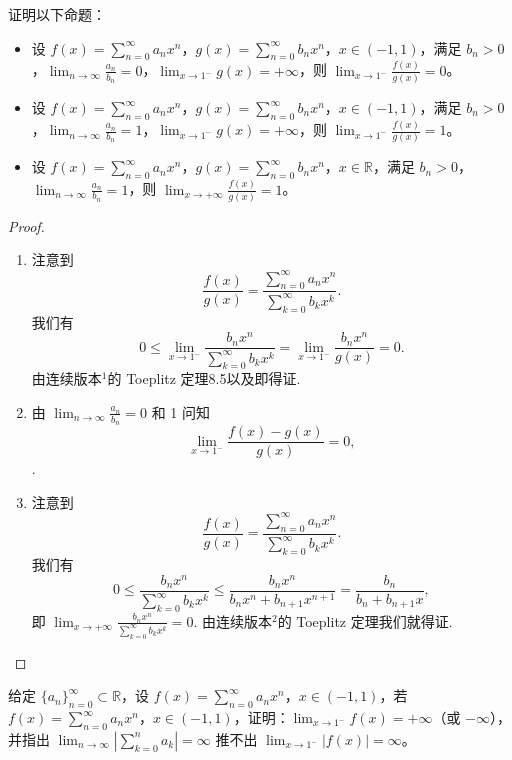 \documentclass[lang=cn,10pt,thmcnt=section]{elegantbook}
\begin{document}
\begin{example}
证明以下命题：
\begin{itemize}
    \item 设 $f(x) = \sum_{n=0}^{\infty} a_n x^n$，$g(x) = \sum_{n=0}^{\infty} b_n x^n$，$x \in (-1, 1)$，满足 $b_n > 0$，$\lim_{n \to \infty} \frac{a_n}{b_n} = 0$，$\lim_{x \to 1^-} g(x) = +\infty$，则 $\lim_{x \to 1^-} \frac{f(x)}{g(x)} = 0$。
    \item 设 $f(x) = \sum_{n=0}^{\infty} a_n x^n$，$g(x) = \sum_{n=0}^{\infty} b_n x^n$，$x \in (-1, 1)$，满足 $b_n > 0$，$\lim_{n \to \infty} \frac{a_n}{b_n} = 1$，$\lim_{x \to 1^-} g(x) = +\infty$，则 $\lim_{x \to 1^-} \frac{f(x)}{g(x)} = 1$。
    \item 设 $f(x) = \sum_{n=0}^{\infty} a_n x^n$，$g(x) = \sum_{n=0}^{\infty} b_n x^n$，$x \in \mathbb{R}$，满足 $b_n > 0$，$\lim_{n \to \infty} \frac{a_n}{b_n} = 1$，则 $\lim_{x \to +\infty} \frac{f(x)}{g(x)} = 1$。
\end{itemize}
\end{example}
\begin{proof}
	\begin{enumerate}
		\item 注意到
		\[
		\frac{f(x)}{g(x)} = \frac{\sum_{n=0}^\infty a_n x^n}{\sum_{k=0}^\infty b_k x^k}.
		\]
		我们有
		\[
		0 \le \lim_{x\to 1^-} \frac{b_n x^n}{\sum_{k=0}^\infty b_k x^k} = \lim_{x\to 1^-} \frac{b_n x^n}{g(x)} = 0.
		\]
		由连续版本$^1$的 Toeplitz 定理8.5以及即得证.
	
		\item 由 $\displaystyle\lim_{n\to\infty} \frac{a_n}{b_n}=0$ 和 1 问知
		\[
		\lim_{x\to 1^-} \frac{f(x)-g(x)}{g(x)} = 0,
		\]
	.
	
		\item 注意到
		\[
		\frac{f(x)}{g(x)} = \frac{\sum_{n=0}^\infty a_n x^n}{\sum_{k=0}^\infty b_k x^k}.
		\]
		我们有
		\[
		0 \le \frac{b_n x^n}{\sum_{k=0}^\infty b_k x^k} \le \frac{b_n x^n}{b_n x^n + b_{n+1} x^{n+1}} = \frac{b_n}{b_n+b_{n+1}x},
		\]
		即 $\displaystyle\lim_{x\to+\infty} \frac{b_n x^n}{\sum_{k=0}^\infty b_k x^k} = 0$. 由连续版本$^2$的 Toeplitz 定理我们就得证.
		
	\end{enumerate}
\end{proof}
\begin{example}
	给定 $\{a_n\}_{n=0}^{\infty} \subset \mathbb{R}$，设 $f(x) = \sum_{n=0}^{\infty} a_n x^n$，$x \in (-1, 1)$，若 $f(x) = \sum_{n=0}^{\infty} a_n x^n$，$x \in (-1, 1)$，证明：$\lim_{x \to 1^-} f(x) = +\infty$（或 $-\infty$），并指出 $\lim_{n \to \infty} \left| \sum_{k=0}^n a_k \right| = \infty$ 推不出 $\lim_{x \to 1^-} |f(x)| = \infty$。
	\end{example}
	
\end{document}
